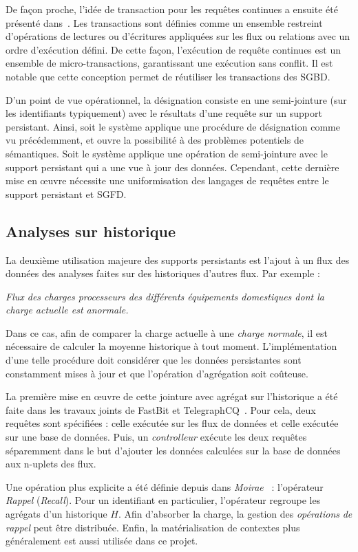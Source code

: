 De façon proche, l'idée de transaction pour les requêtes continues a ensuite été présenté dans~\cite{Botan:transaction}. Les transactions sont définies comme un ensemble restreint d'opérations de lectures ou d'écritures appliquées sur les flux ou relations avec un ordre d'exécution défini. De cette façon, l'exécution de requête continues est un ensemble de micro-transactions, garantissant une exécution sans conflit. Il est notable que cette conception permet de réutiliser les transactions des SGBD.

D'un point de vue opérationnel, la désignation consiste en une semi-jointure (sur les identifiants typiquement) avec le résultats d'une requête sur un support persistant. Ainsi, soit le système applique une procédure de désignation comme vu précédemment, et ouvre la possibilité à des problèmes potentiels de sémantiques. Soit le système applique une opération de semi-jointure avec le support persistant qui a une vue à jour des données. Cependant, cette dernière mise en œuvre nécessite une uniformisation des langages de requêtes entre le support persistant et SGFD.

\subsection{Analyses sur historique}
La deuxième utilisation majeure des supports persistants est l'ajout à un flux des données des analyses faites sur des historiques d'autres flux. Par exemple :
\begin{center}
\it Flux des charges processeurs des différents équipements domestiques dont la charge actuelle est anormale.
\end{center}
Dans ce cas, afin de comparer la charge actuelle à une \textit{charge normale}, il est nécessaire de calculer la moyenne historique à tout moment. L'implémentation d'une telle procédure doit considérer que les données persistantes sont constamment mises à jour et que l'opération d'agrégation soit coûteuse. 

La première mise en œuvre de cette jointure avec agrégat sur l'historique a été faite dans les travaux joints de FastBit et TelegraphCQ~\cite{Reiss:fastbit}. Pour cela, deux requêtes sont spécifiées : celle exécutée sur les flux de données et celle exécutée sur une base de données. Puis, un \textit{controlleur} exécute les deux requêtes séparemment dans le but d'ajouter les données calculées sur la base de données aux n-uplets des flux.

Une opération plus explicite a été définie depuis dans \textit{Moirae}~\cite{Balazinska:moirae} : l'opérateur \textit{Rappel} (\textit{Recall}). Pour un identifiant en particulier, l'opérateur regroupe les agrégats d'un historique $H$. Afin d'absorber la charge, la gestion des \textit{opérations} \textit{de} \textit{rappel} peut être distribuée. Enfin, la matérialisation de contextes plus généralement est aussi utilisée dans ce projet.

